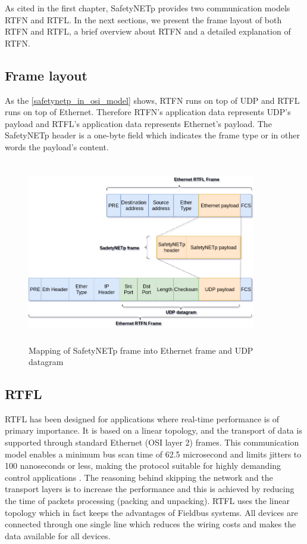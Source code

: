 As cited in the first chapter, SafetyNETp provides two communication models \ac{RTFN} and \ac{RTFL}. In the next sections, we present the
frame layout of both \ac{RTFN} and \ac{RTFL}, a brief overview about \ac{RTFN} and a detailed explanation of \ac{RTFN}.

\subsection{Frame layout}

As the \autoref{safetynetp_in_osi_model} shows, \ac{RTFN} runs on top of \ac{UDP} and \ac{RTFL} runs on top of Ethernet. Therefore \ac{RTFN}'s application
data represents \ac{UDP}'s payload and \ac{RTFL}'s application data represents Ethernet's payload. The SafetyNETp header is a one-byte
field which indicates the frame type or in other words the payload's content.

\begin{figure}[H]
\centering
\includegraphics[width=10cm,height=8cm]{figures/safetynetp/safetynetp_frame_layout.png}
\caption{Mapping of SafetyNETp frame into Ethernet frame and UDP datagram}\label{frame-layout}
\end{figure}

\subsection{RTFL}

\ac{RTFL} has been designed for applications where real-time performance is of primary
importance. It is based on a linear topology, and the transport of data is supported through
standard Ethernet (OSI layer 2) frames. This communication model enables a minimum bus scan
time of 62.5 microsecond and limits jitters to 100 nanoseconds or less, making the protocol suitable for highly demanding
control applications \cite{zurawski2014industrial}. The reasoning behind skipping the network and the transport layers is to
increase the performance and this is achieved by reducing the time of packets processing (packing and unpacking).
\ac{RTFL} uses the linear topology which in fact keeps the advantages of Fieldbus systems. All devices are
connected through one single line which reduces the wiring costs and makes the data available for all devices.

